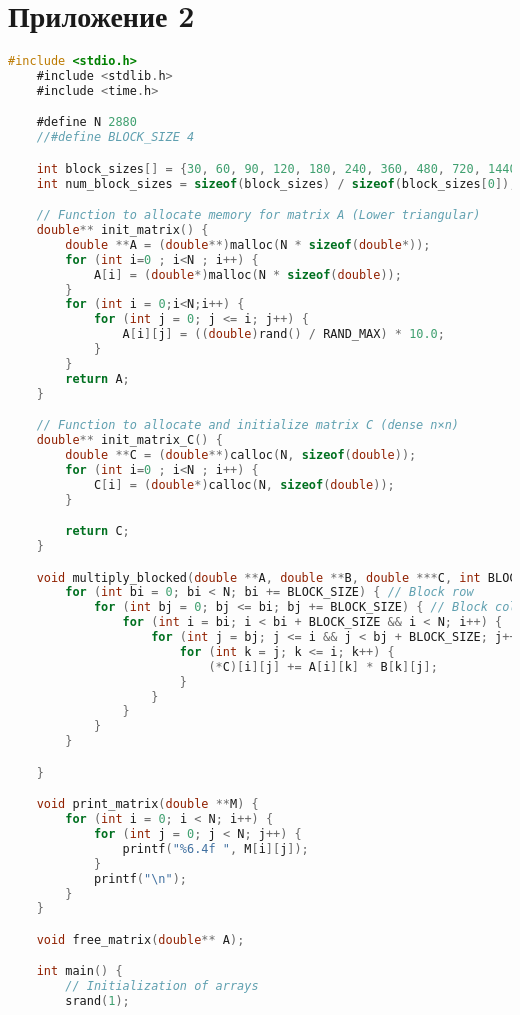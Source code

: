 \documentclass[14pt, russian]{matmex-diploma-custom}
\begin{document}
\section{Приложение 2}
{\footnotesize
\begin{lstlisting}[language=C, caption={Приложение 2D массивов с блочной оптимизацией}]
    #include <stdio.h>
    #include <stdlib.h>
    #include <time.h>

    #define N 2880
    //#define BLOCK_SIZE 4

    int block_sizes[] = {30, 60, 90, 120, 180, 240, 360, 480, 720, 1440};
    int num_block_sizes = sizeof(block_sizes) / sizeof(block_sizes[0]);

    // Function to allocate memory for matrix A (Lower triangular)
    double** init_matrix() {
        double **A = (double**)malloc(N * sizeof(double*));
        for (int i=0 ; i<N ; i++) {
            A[i] = (double*)malloc(N * sizeof(double));
        }
        for (int i = 0;i<N;i++) {
            for (int j = 0; j <= i; j++) {
                A[i][j] = ((double)rand() / RAND_MAX) * 10.0;
            }
        }
        return A;
    }

    // Function to allocate and initialize matrix C (dense n×n)
    double** init_matrix_C() {
        double **C = (double**)calloc(N, sizeof(double));
        for (int i=0 ; i<N ; i++) {
            C[i] = (double*)calloc(N, sizeof(double));
        }

        return C;
    }

    void multiply_blocked(double **A, double **B, double ***C, int BLOCK_SIZE) {
        for (int bi = 0; bi < N; bi += BLOCK_SIZE) { // Block row
            for (int bj = 0; bj <= bi; bj += BLOCK_SIZE) { // Block column
                for (int i = bi; i < bi + BLOCK_SIZE && i < N; i++) {
                    for (int j = bj; j <= i && j < bj + BLOCK_SIZE; j++) {
                        for (int k = j; k <= i; k++) {
                            (*C)[i][j] += A[i][k] * B[k][j];
                        }
                    }
                }
            }
        }

    }

    void print_matrix(double **M) {
        for (int i = 0; i < N; i++) {
            for (int j = 0; j < N; j++) {
                printf("%6.4f ", M[i][j]);
            }
            printf("\n");
        }
    }

    void free_matrix(double** A);

    int main() {
        // Initialization of arrays
        srand(1);


\end{lstlisting}}
\end{document}
